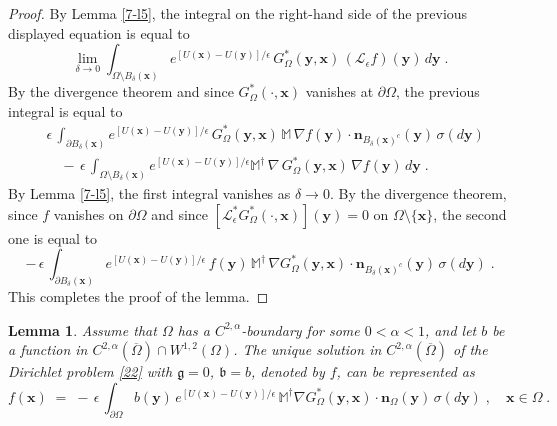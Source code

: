 \documentclass[reqno]{amsart}
\newtheorem{lemma}[theorem]{Lemma}
\newcounter{as}[section]
\newcommand{\mc}[1]{{\mathcal #1}}
\newcommand{\mf}[1]{{\mathfrak #1}}
\newcommand{\bb}[1]{{\mathbb #1}}
\newcommand{\bs}[1]{{\boldsymbol #1}}
\newcommand{\<}{\langle}
\renewcommand{\>}{\rangle}
\begin{document}
\begin{proof}
By Lemma \ref{7-l5}, the integral on the right-hand side of the
previous displayed equation is equal to
\begin{equation*}
\lim_{\delta\to 0} \int_{\Omega\setminus B_\delta(\bs x)} e^{[U(\bs x) - U(\bs y)]/\epsilon}
\, G_\Omega^*(\bs y, \bs x) \, (\mc L_\epsilon f) (\bs y)\, d\bs y\;.
\end{equation*}
By the divergence theorem and since $G_\Omega^*(\cdot, \bs x)$ vanishes at
$\partial \Omega$, the previous integral is equal to
\begin{equation}
\label{7-14}
\begin{aligned}
& \epsilon \, \int_{\partial B_\delta(\bs x)} e^{[U(\bs x) - U(\bs y)]/\epsilon}
\, G_\Omega^*(\bs y, \bs x) \, \bb M\, \nabla f (\bs y) \cdot
\bs n_{B_\delta(\bs x)^c}(\bs y) \, \sigma(d\bs y) \\
&\quad - \,
\epsilon\, \int_{\Omega\setminus B_\delta(\bs x)} e^{[U(\bs x) - U(\bs y)]/\epsilon}
\bb M^\dagger \, \nabla \, G_\Omega^*(\bs y, \bs x) \, \nabla f (\bs y)\, d\bs y\;.
\end{aligned}
\end{equation}
By Lemma \ref{7-l5}, the first integral vanishes as $\delta\to 0$. By
the divergence theorem, since $f$ vanishes on $\partial \Omega$ and
since $[\mc L^*_\epsilon G_\Omega^*(\cdot, \bs x)] (\bs y) = 0$ on
$\Omega\setminus\{\bs x\}$, the second one is equal to
\begin{equation*}
-\, \epsilon \, \int_{\partial B_\delta(\bs x)} e^{[U(\bs x) - U(\bs y)]/\epsilon}
\, f (\bs y) \, \bb M^\dagger \, \nabla  G_\Omega^*(\bs y, \bs x)
\cdot \bs n_{B_\delta(\bs x)^c}(\bs y) \, \sigma(d\bs y) \;.
\end{equation*}
This completes the proof of the lemma.
\end{proof}

\begin{lemma}
\label{7-l7}
Assume that $\Omega$ has a $C^{2,\alpha}$-boundary for some
$0<\alpha<1$, and let $b$ be a function in
$C^{2,\alpha}(\overline{\Omega}) \cap W^{1,2}(\Omega)$. The unique
solution in $C^{2,\alpha}(\overline{\Omega})$ of the Dirichlet problem
\eqref{22} with $\mf g=0$, $\mf b = b$, denoted by $f$, can be
represented as
\begin{equation*}
f(\bs x) \;=\; -\, \epsilon\, \int_{\partial \Omega} b(\bs y)\, e^{[U(\bs x)
  - U(\bs y)]/\epsilon} \, \bb M^\dagger \nabla G_{\Omega}^* (\bs y, \bs x)
\cdot \bs n_{\Omega }(\bs{y}) \, \sigma(d\bs y)\;, \quad \bs x\in\Omega\;.
\end{equation*}
\end{lemma}
\end{document}
